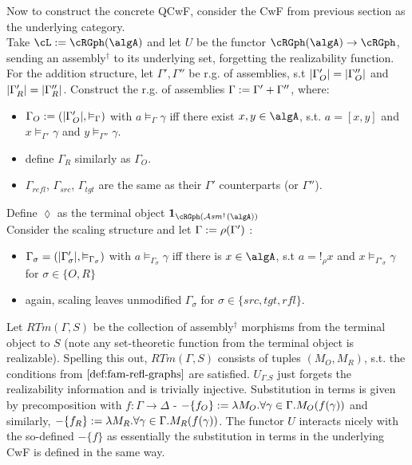 \documentclass[12pt,a4paper]{article}
\def\cAsm{\mathcal{A}\mathit{sm}^\dagger}
\def\src{_{src}}\alwaysmath{src}
\def\rfl{_{refl}}\alwaysmath{rfl}
\def\tgt{_{tgt}}\alwaysmath{tgt}
\renewcommand{\O}{_{O}}
\newcommand{\R}{\ensuremath{_{R}}}
\begin{document}
Now to construct the concrete QCwF, consider the CwF from previous section as the underlying category.\\
Take $\cL := \cRGph(\algA)$ and let $U$ be the functor $\cRGph(\algA) \to \cRGph$, sending an assembly$^\dagger$ to its underlying set, forgetting the realizability function.\\
For the addition structure, let $\Gamma', \Gamma''$ be r.g. of assemblies, s.t  $\carr{\Gamma'\O}=\carr{\Gamma''\O}$ and $\carr{\Gamma'\R}=\carr{\Gamma''\R}$. Construct the r.g. of assemblies $\Gamma := \Gamma' + \Gamma''$, where:
\begin{itemize}[noitemsep]
    \item $\Gamma\O \define (\carr{\Gamma'\O}, \vDash_\Gamma)$ with $ a \vDash_\Gamma \gamma$ iff there exist $x,y \in \algA$, s.t. $a = [x,y]$ and $x \vDash_{\Gamma'} \gamma$ and $ y \vDash_{\Gamma''} \gamma$.

    \item define $\Gamma\R$ similarly as $\Gamma\O$.

    \item $\Gamma\rfl$, $\Gamma\src$, $\Gamma\tgt$ are the same as their $\Gamma'$ counterparts (or $\Gamma''$).\\
\end{itemize}
Define $\lozenge$ as the terminal object $\mathbf{1}_{\cRGph(\cAsm(\algA))}$\\
Consider the scaling structure and let $\Gamma := \rho(\Gamma')$ :
  \begin{itemize}
    \item $\Gamma_\sigma = (|\Gamma'_\sigma|, \vDash_{\Gamma_\sigma})$ with $a \vDash_{\Gamma_\sigma} \gamma$ iff there is $x \in \algA$, s.t $a = !_\rho x$ and $x \vDash_{\Gamma'_\sigma} \gamma$ for $\sigma \in \{O, R\}$
    
    \item again, scaling leaves unmodified $\Gamma_\sigma$ for $\sigma\in\{src,tgt,rfl\}$.
\end{itemize}
Let $RTm(\Gamma, S)$ be the collection of assembly$^\dagger$ morphisms from the terminal object to $S$ (note any set-theoretic function from the terminal object is realizable). Spelling this out, $RTm(\Gamma, S)$ consists of tuples $(M\O, M\R)$, s.t. the conditions from $\cref{def:fam-refl-graphs}$ are satisfied. $U_{\Gamma.S}$ just forgets the realizability information and is trivially injective. Substitution in terms is given by precomposition with $f : \Gamma \to \Delta$ - $-\{f\O\} \define \lambda M\O. \forall \gamma \in \Gamma . M\O(f(\gamma))$ and similarly, $-\{f\R\} \define \lambda M\R . \forall \gamma \in \Gamma . M\R(f(\gamma))$. The functor $U$ interacts nicely with the so-defined $-\{f\}$ as essentially the substitution in terms in the underlying CwF is defined in the same way.\\
\end{document}
